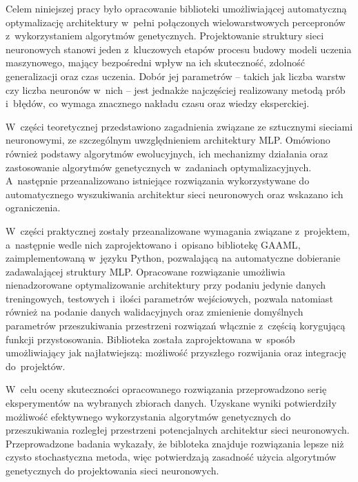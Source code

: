Celem niniejszej pracy było opracowanie biblioteki
umożliwiającej automatyczną optymalizację
architektury w~pełni połączonych
wielowarstwowych percepronów
z~wykorzystaniem algorytmów genetycznych.
Projektowanie struktury sieci neuronowych
stanowi jeden z~kluczowych etapów procesu
budowy modeli uczenia maszynowego,
mający bezpośredni wpływ na ich skuteczność,
zdolność generalizacji oraz czas uczenia.
Dobór jej parametrów -- takich jak
liczba warstw czy liczba neuronów w~nich
-- jest jednakże najczęściej
realizowany metodą prób i~błędów,
co wymaga znacznego nakładu czasu
oraz wiedzy eksperckiej.

W~części teoretycznej przedstawiono zagadnienia
związane ze sztucznymi sieciami neuronowymi,
ze szczególnym uwzględnieniem architektury \acrshort{MLP}.
Omówiono również podstawy algorytmów ewolucyjnych,
ich mechanizmy działania oraz zastosowanie
algorytmów genetycznych w~zadaniach optymalizacyjnych.
A~następnie przeanalizowano istniejące
rozwiązania wykorzystywane do automatycznego
wyszukiwania architektur sieci neuronowych
oraz wskazano ich ograniczenia.

W~części praktycznej zostały przeanalizowane
wymagania związane z~projektem,
a~następnie wedle nich zaprojektowano
i~opisano bibliotekę \acrshort{GAAML},
zaimplementowaną w~języku Python,
pozwalającą na automatyczne dobieranie
zadawalającej struktury \acrshort{MLP}.
Opracowane rozwiązanie umożliwia
nienadzorowane optymalizowanie architektury
przy podaniu jedynie danych treningowych,
testowych i~ilości parametrów wejściowych,
pozwala natomiast również na podanie danych
walidacyjnych oraz zmienienie domyślnych
parametrów przeszukiwania przestrzeni
rozwiązań włącznie z~częścią
korygującą funkcji przystosowania.
Biblioteka została zaprojektowana
w~sposób umożliwiający jak najłatwiejszą:
możliwość przyszłego rozwijania
oraz integrację do~projektów.

W~celu oceny skuteczności opracowanego
rozwiązania przeprowadzono serię
eksperymentów na wybranych zbiorach danych.
Uzyskane wyniki potwierdziły możliwość efektywnego
wykorzystania algorytmów genetycznych do przeszukiwania
rozległej przestrzeni potencjalnych
architektur sieci neuronowych.
Przeprowadzone badania wykazały,
że bibloteka znajduje rozwiązania
lepsze niż czysto stochastyczna metoda,
więc potwierdzają zasadność
użycia algorytmów genetycznych
do projektowania sieci neuronowych.
